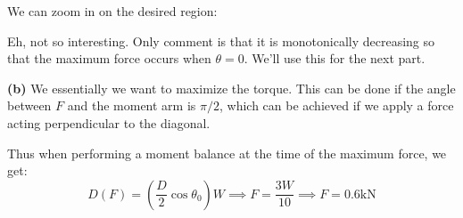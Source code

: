 \documentclass{article}
\begin{document}
We can zoom in on the desired region:
\begin{center}
\end{center}
Eh, not so interesting. Only comment is that it is monotonically decreasing so that the maximum force occurs when $\theta=0$. We'll use this for the next part.

\textbf{(b)} We essentially we want to maximize the torque. This can be done if the angle between $F$ and the moment arm is $\pi/2$, which can be achieved if we apply a force acting perpendicular to the diagonal.

Thus when performing a moment balance at the time of the maximum force, we get:
\begin{equation}
    D(F) = \left(\frac{D}{2}\cos\theta_0\right)W \implies F = \frac{3W}{10} \implies \boxed{F=0.6\si{\kilo\newton}}
    \label{eq:}
\end{equation}

\newpage
\end{document}
